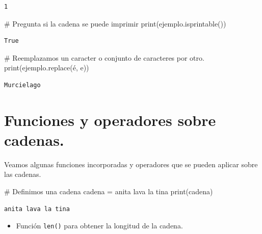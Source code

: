 \documentclass[
  spanish,
  letterpaper,
]{scrbook}
\newenvironment{Shaded}{\begin{snugshade}}{\end{snugshade}}
\newcommand{\BuiltInTok}[1]{\textcolor[rgb]{0.00,0.23,0.31}{#1}}
\newcommand{\CommentTok}[1]{\textcolor[rgb]{0.37,0.37,0.37}{#1}}
\newcommand{\NormalTok}[1]{\textcolor[rgb]{0.00,0.23,0.31}{#1}}
\newcommand{\OperatorTok}[1]{\textcolor[rgb]{0.37,0.37,0.37}{#1}}
\newcommand{\StringTok}[1]{\textcolor[rgb]{0.13,0.47,0.30}{#1}}
\providecommand{\tightlist}{%
  \setlength{\itemsep}{0pt}\setlength{\parskip}{0pt}}
\theoremstyle{definition}
\theoremstyle{remark}
\begin{document}
\begin{verbatim}
1
\end{verbatim}

\begin{Shaded}
\begin{Highlighting}[]
\CommentTok{\# Pregunta si la cadena se puede imprimir}
\BuiltInTok{print}\NormalTok{(ejemplo.isprintable())}
\end{Highlighting}
\end{Shaded}

\begin{verbatim}
True
\end{verbatim}

\begin{Shaded}
\begin{Highlighting}[]
\CommentTok{\# Reemplazamos un caracter o conjunto de caracteres por otro.}
\BuiltInTok{print}\NormalTok{(ejemplo.replace(}\StringTok{\textquotesingle{}é\textquotesingle{}}\NormalTok{, }\StringTok{\textquotesingle{}e\textquotesingle{}}\NormalTok{))}
\end{Highlighting}
\end{Shaded}

\begin{verbatim}
Murcielago
\end{verbatim}

\section{Funciones y operadores sobre
cadenas.}\label{funciones-y-operadores-sobre-cadenas.}

Veamos algunas funciones incorporadas y operadores que se pueden aplicar
sobre las cadenas.

\begin{Shaded}
\begin{Highlighting}[]
\CommentTok{\# Definimos una cadena}
\NormalTok{cadena }\OperatorTok{=} \StringTok{\textquotesingle{}anita lava la tina\textquotesingle{}}
\BuiltInTok{print}\NormalTok{(cadena)}
\end{Highlighting}
\end{Shaded}

\begin{verbatim}
anita lava la tina
\end{verbatim}

\begin{itemize}
\tightlist
\item
  Función \texttt{len()} para obtener la longitud de la cadena.
\end{itemize}
\end{document}
